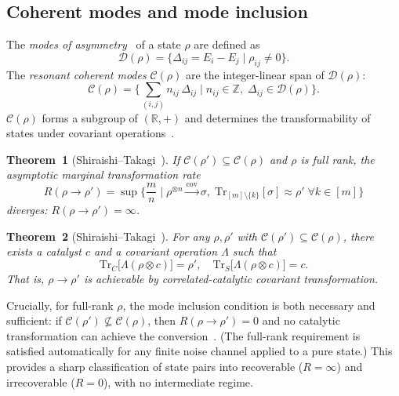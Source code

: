 \documentclass[prx,twocolumn,superscriptaddress,longbibliography,floatfix]{revtex4-2}
\begin{document}
\subsection{Coherent modes and mode inclusion}
\label{sec:modes}

The \emph{modes of asymmetry}~\cite{Lostaglio2019,Marvian2013} of a state $\rho$ are defined as
\begin{equation}
\mathcal{D}(\rho) = \bigl\{ \Delta_{ij} = E_i - E_j \mid \rho_{ij} \neq 0 \bigr\}.
\label{eq:modes}
\end{equation}
The \emph{resonant coherent modes} $\mathcal{C}(\rho)$ are the integer-linear span of $\mathcal{D}(\rho)$:
\begin{equation}
\mathcal{C}(\rho) = \biggl\{ \sum_{(i,j)} n_{ij}\, \Delta_{ij} \;\bigg|\; n_{ij} \in \mathbb{Z},\; \Delta_{ij} \in \mathcal{D}(\rho) \biggr\}.
\label{eq:resonant_modes}
\end{equation}
$\mathcal{C}(\rho)$ forms a subgroup of $(\mathbb{R}, +)$ and determines the transformability of states under covariant operations~\cite{Shiraishi2024}.

\textbf{Theorem~1} (Shiraishi--Takagi~\cite{Shiraishi2024}).
\emph{If $\mathcal{C}(\rho') \subseteq \mathcal{C}(\rho)$ and $\rho$ is full rank, the asymptotic marginal transformation rate}
\begin{equation*}
R(\rho \to \rho') = \sup \biggl\{ \frac{m}{n} \;\bigg|\; \rho^{\otimes n} \xrightarrow{\mathrm{cov}} \sigma,\; \mathrm{Tr}_{[m]\setminus\{k\}}[\sigma] \approx \rho' \;\forall k \in [m] \biggr\}
\end{equation*}
\emph{diverges: $R(\rho \to \rho') = \infty$.}

\textbf{Theorem~2} (Shiraishi--Takagi~\cite{Shiraishi2024}).
\emph{For any $\rho, \rho'$ with $\mathcal{C}(\rho') \subseteq \mathcal{C}(\rho)$, there exists a catalyst $c$ and a covariant operation $\Lambda$ such that}
\begin{equation}
\mathrm{Tr}_C\bigl[\Lambda(\rho \otimes c)\bigr] = \rho', \quad \mathrm{Tr}_S\bigl[\Lambda(\rho \otimes c)\bigr] = c.
\label{eq:catalytic}
\end{equation}
\emph{That is, $\rho \to \rho'$ is achievable by correlated-catalytic covariant transformation.}

Crucially, for full-rank $\rho$, the mode inclusion condition is both necessary and sufficient: if $\mathcal{C}(\rho') \not\subseteq \mathcal{C}(\rho)$, then $R(\rho \to \rho') = 0$ and no catalytic transformation can achieve the conversion~\cite{Shiraishi2024}.
(The full-rank requirement is satisfied automatically for any finite noise channel applied to a pure state.)
This provides a sharp classification of state pairs into recoverable ($R = \infty$) and irrecoverable ($R = 0$), with no intermediate regime.
\end{document}
